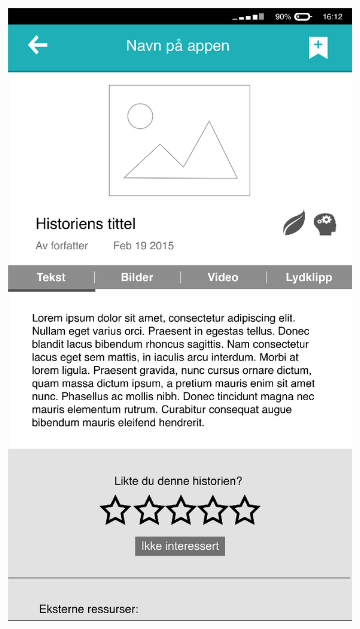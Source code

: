 \begin{figure}
	\centering
	\begin{subfigure}[h]{0.4\textwidth}
		\includegraphics[width=\textwidth]{fig/prototype1}
	\end{subfigure}
	\begin{subfigure}[h]{0.4\textwidth}

\end{subfigure}
\end{figure}
